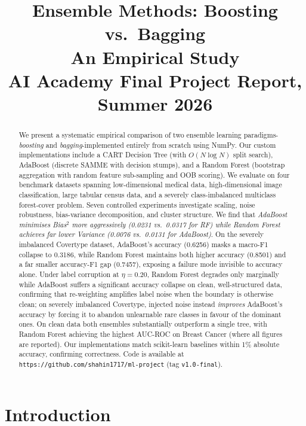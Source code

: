 \documentclass[conference]{IEEEtran}
\title{Ensemble Methods: Boosting vs.\ Bagging\\An Empirical Study\\
{\large AI Academy Final Project Report, Summer 2026}}
\author{
\IEEEauthorblockN{Shahin Alakparov, Narmina Ibragimova, Hasan Mammadov}
\IEEEauthorblockA{AI Academy, National AI Center\\
Spring 2026\\
\{sahin.alekperov25, narmine.ibrahimova25, hasan.memmedov25\}@aiacademy.az}
}
\begin{document}
\maketitle

\begin{abstract}
We present a systematic empirical comparison of two ensemble learning
paradigms-\emph{boosting} and \emph{bagging}-implemented entirely
from scratch using NumPy.  Our custom implementations include a CART
Decision Tree (with $O(N\!\log\!N)$ split search), AdaBoost (discrete
SAMME with decision stumps), and a Random Forest (bootstrap aggregation
with random feature sub-sampling and OOB scoring).  We evaluate on four
benchmark datasets spanning low-dimensional medical data, high-dimensional
image classification, large tabular census data, and a severely class-imbalanced
multiclass forest-cover problem.  Seven controlled
experiments investigate scaling, noise robustness, bias-variance
decomposition, and cluster structure.  We find that \emph{AdaBoost
minimises Bias$^2$ more aggressively (0.0231 vs.\ 0.0317 for RF) while
Random Forest achieves far lower Variance (0.0076 vs.\ 0.0131 for AdaBoost)}.
On the severely imbalanced Covertype dataset, AdaBoost's accuracy (0.6256)
masks a macro-F1 collapse to 0.3186, while Random Forest maintains both higher
accuracy (0.8501) and a far smaller accuracy-F1 gap (0.7457), exposing a failure
mode invisible to accuracy alone.
Under label corruption at $\eta{=}0.20$, Random Forest degrades only
marginally while AdaBoost suffers a significant accuracy collapse on clean,
well-structured data, confirming that re-weighting amplifies label noise
when the boundary is otherwise clean; on severely imbalanced Covertype,
injected noise instead \emph{improves} AdaBoost's accuracy by forcing it
to abandon unlearnable rare classes in favour of the dominant ones.  On
clean data both ensembles substantially outperform a single tree, with
Random Forest achieving the highest AUC-ROC on Breast Cancer (where all
figures are reported).  Our implementations
match scikit-learn baselines within 1\% absolute accuracy, confirming
correctness.  Code is available at \texttt{https://github.com/shahin1717/ml-project} (tag
\texttt{v1.0-final}).
\end{abstract}

\section{Introduction}
\label{sec:intro}
\end{document}
